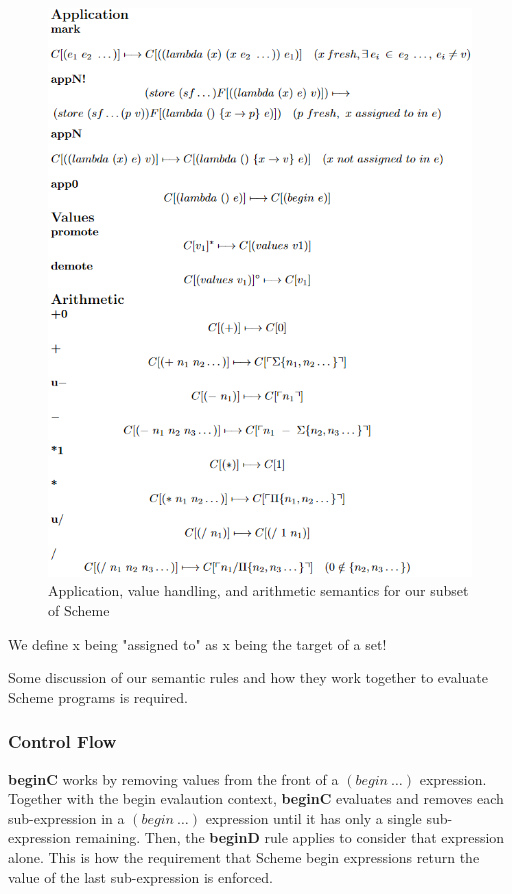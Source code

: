 \begin{figure}
\centering
\includegraphics[width=\textwidth,height=\textheight,keepaspectratio]{figures/sem_2.png}
    \caption{Application, value handling, and arithmetic semantics for our subset of Scheme}
    \label{fig:Sem2}
\end{figure}

We define x being "assigned to" as x being the target of a set!

Some discussion of our semantic rules and how they work together to evaluate Scheme programs is required.

\subsubsection{Control Flow}\label{sxn:sem_cf}
\textbf{beginC} works by removing values from the front of a $(begin\ \dots)$ expression. Together with the begin evalaution context, \textbf{beginC} evaluates and removes each sub-expression in a $(begin\ \dots)$ expression until it has only a single sub-expression remaining. Then, the \textbf{beginD} rule applies to consider that expression alone. This is how the requirement that Scheme begin expressions return the value of the last sub-expression is enforced.

